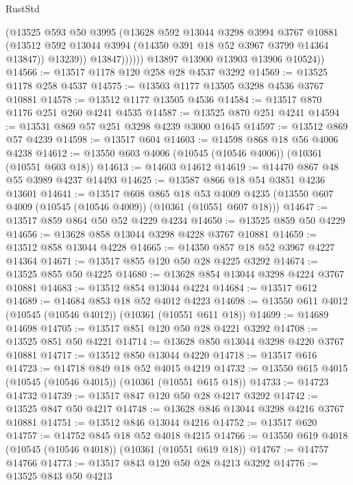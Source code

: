 \begin{lexlean}{RustStd}
\begin{coremodule}
                    (@13525
                      @593
                      @50
                      @3995
                      (@13628
                        @592
                        @13044
                        @3298
                        @3994
                        @3767
                        @10881
                        (@13512 @592 @13044 @3994 (@14350 @391 @18 @52 @3967 @3799 @14364 @13847))
                        @13239))
                    @13847))))))
        @13897
        @13900
        @13903
        @13906
        @10524))
@14566 := @13517 @1178 @120 @258 @28 @4537 @3292
@14569 := @13525 @1178 @258 @4537
@14575 := @13503 @1177 @13505 @3298 @4536 @3767 @10881
@14578 := @13512 @1177 @13505 @4536
@14584 := @13517 @870 @1176 @251 @260 @4241 @4535
@14587 := @13525 @870 @251 @4241
@14594 := @13531 @869 @57 @251 @3298 @4239 @3000 @1645
@14597 := @13512 @869 @57 @4239
@14598 := @13517 @604
@14603 := @14598 @868 @18 @56 @4006 @4238
@14612 := @13550 @603 @4006 (@10545 (@10546 @4006)) (@10361 (@10551 @603 @18))
@14613 := @14603 @14612
@14619 := @14470 @867 @48 @55 @3989 @4237 @14493
@14625 := @13587 @866 @18 @54 @3851 @4236 @13601
@14641 := @13517
    @608
    @865
    @18
    @53
    @4009
    @4235
    (@13550 @607 @4009 (@10545 (@10546 @4009)) (@10361 (@10551 @607 @18)))
@14647 := @13517 @859 @864 @50 @52 @4229 @4234
@14650 := @13525 @859 @50 @4229
@14656 := @13628 @858 @13044 @3298 @4228 @3767 @10881
@14659 := @13512 @858 @13044 @4228
@14665 := @14350 @857 @18 @52 @3967 @4227 @14364
@14671 := @13517 @855 @120 @50 @28 @4225 @3292
@14674 := @13525 @855 @50 @4225
@14680 := @13628 @854 @13044 @3298 @4224 @3767 @10881
@14683 := @13512 @854 @13044 @4224
@14684 := @13517 @612
@14689 := @14684 @853 @18 @52 @4012 @4223
@14698 := @13550 @611 @4012 (@10545 (@10546 @4012)) (@10361 (@10551 @611 @18))
@14699 := @14689 @14698
@14705 := @13517 @851 @120 @50 @28 @4221 @3292
@14708 := @13525 @851 @50 @4221
@14714 := @13628 @850 @13044 @3298 @4220 @3767 @10881
@14717 := @13512 @850 @13044 @4220
@14718 := @13517 @616
@14723 := @14718 @849 @18 @52 @4015 @4219
@14732 := @13550 @615 @4015 (@10545 (@10546 @4015)) (@10361 (@10551 @615 @18))
@14733 := @14723 @14732
@14739 := @13517 @847 @120 @50 @28 @4217 @3292
@14742 := @13525 @847 @50 @4217
@14748 := @13628 @846 @13044 @3298 @4216 @3767 @10881
@14751 := @13512 @846 @13044 @4216
@14752 := @13517 @620
@14757 := @14752 @845 @18 @52 @4018 @4215
@14766 := @13550 @619 @4018 (@10545 (@10546 @4018)) (@10361 (@10551 @619 @18))
@14767 := @14757 @14766
@14773 := @13517 @843 @120 @50 @28 @4213 @3292
@14776 := @13525 @843 @50 @4213

\end{coremodule}
\end{lexlean}
